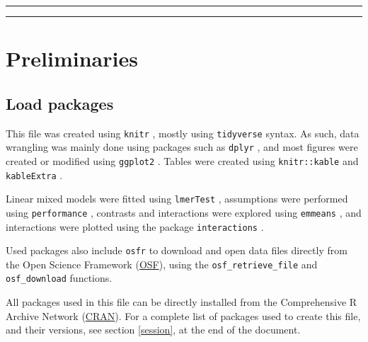 \documentclass[
  bookmarksnumbered]{article}
\begin{document}
\begin{center}\rule{0.5\linewidth}{0.5pt}\end{center}

\par
\endgroup

{\hypersetup{hidelinks}
\setcounter{tocdepth}{6}
\tableofcontents
}
\opensupplement

\begin{center}\rule{0.5\linewidth}{0.5pt}\end{center}

\hypertarget{preliminaries}{%
\section{Preliminaries}\label{preliminaries}}

\hypertarget{load-packages}{%
\subsection{Load packages}\label{load-packages}}

This file was created using \texttt{knitr} \autocite{knitrcit}, mostly using \texttt{tidyverse} \autocite{tidyversecit} syntax. As such, data wrangling was mainly done using packages such as \texttt{dplyr} \autocite{dplyrcit}, and most figures were created or modified using \texttt{ggplot2} \autocite{ggplotcit}. Tables were created using \texttt{knitr::kable} and \texttt{kableExtra} \autocite{kableExtracit}.

Linear mixed models were fitted using \texttt{lmerTest} \autocite{lmertestcit}, assumptions were performed using \texttt{performance} \autocite{ludecke2021}, contrasts and interactions were explored using \texttt{emmeans} \autocite{emmeanscit}, and interactions were plotted using the package \texttt{interactions} \autocite{interactionscit}.

Used packages also include \texttt{osfr} \autocite{osfrcit} to download and open data files directly from the Open Science Framework (\href{https://osf.io/}{OSF}), using the \texttt{osf\_retrieve\_file} and \texttt{osf\_download} functions.

All packages used in this file can be directly installed from the Comprehensive R Archive Network (\href{https://cran.r-project.org/}{CRAN}). For a complete list of packages used to create this file, and their versions, see section \ref{session}, at the end of the document.
\end{document}
